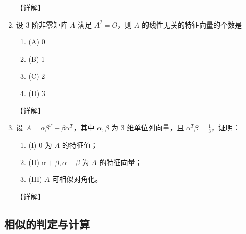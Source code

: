 \documentclass[12pt, a4paper, oneside, UTF8]{ctexbook}
\begin{document}
\begin{enumerate}[label=\arabic*.]
    \begin{solution}
    【详解】
    \end{solution}
    
    \item 设 3 阶非零矩阵 $A$ 满足 $A^2 = O$，则 $A$ 的线性无关的特征向量的个数是
    \begin{enumerate}
        \item (A) 0
        \item (B) 1
        \item (C) 2
        \item (D) 3
    \end{enumerate}
    
    \begin{solution}
    【详解】
    \end{solution}
    
    \item 设 $A = \alpha \beta^T + \beta \alpha^T$，其中 $\alpha, \beta$ 为 3 维单位列向量，且 $\alpha^T \beta = \frac{1}{3}$，证明：
    \begin{enumerate}
        \item (I) 0 为 $A$ 的特征值；
        \item (II) $\alpha + \beta, \alpha - \beta$ 为 $A$ 的特征向量；
        \item (III) $A$ 可相似对角化。
    \end{enumerate}
    
    \begin{solution}
    【详解】
    \end{solution}
\end{enumerate}

\subsection{相似的判定与计算}
\end{document}
